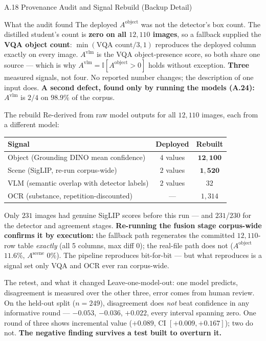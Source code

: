 \documentclass[aspectratio=169,11pt]{beamer}
\begin{document}
\begin{frame}{A.18 Provenance Audit and Signal Rebuild (Backup Detail)}
\scriptsize
\vspace{-4mm}
\begin{block}{\scriptsize What the audit found}
\tiny The deployed $A^{\text{object}}$ was not the detector's box count. The distilled student's count is \textbf{zero on all $12{,}110$ images}, so a fallback supplied the \textbf{VQA object count}: $\min(\text{VQA count}/3,1)$ reproduces the deployed column exactly on every image. $A^{\text{vlm}}$ is the VQA object-presence score, so both share one source --- which is why $A^{\text{vlm}}=\mathbb{I}[A^{\text{object}}>0]$ holds without exception. \textbf{Three} measured signals, not four. No reported number changes; the description of one input does. \textbf{A second defect, found only by running the models (A.24):} $A^{\text{vlm}}$ is $2/4$ on $98.9\%$ of the corpus.
\end{block}
\vspace{-4.5mm}
\begin{block}{\scriptsize The rebuild}
\tiny Re-derived from raw model outputs for all $12{,}110$ images, each from a different model:
\vskip 2pt
\begin{center}
\begin{tabular}{lcc}
\toprule
\textbf{Signal} & \textbf{Deployed} & \textbf{Rebuilt} \\
\midrule
Object (Grounding DINO mean confidence) & $4$ values & $\mathbf{12{,}100}$ \\
Scene (SigLIP, re-run corpus-wide) & $2$ values & $\mathbf{1{,}520}$ \\
VLM (semantic overlap with detector labels) & $2$ values & $32$ \\
OCR (substance, repetition-discounted) & --- & $1{,}314$ \\
\bottomrule
\end{tabular}
\end{center}
Only $231$ images had genuine SigLIP scores before this run --- and $231$/$230$ for the detector and agreement stages. \textbf{Re-running the fusion stage corpus-wide confirms it by execution:} the fallback path regenerates the committed $12{,}110$-row table \emph{exactly} (all 5 columns, max diff $0$); the real-file path does not ($A^{\text{object}}$ $11.6\%$, $A^{\text{scene}}$ $0\%$). The pipeline reproduces bit-for-bit --- but what reproduces is a signal set only VQA and OCR ever ran corpus-wide.
\end{block}
\vspace{-4.5mm}
\begin{alertblock}{\scriptsize The retest, and what it changed}
\tiny Leave-one-model-out: one model predicts, disagreement is measured over the other three, error comes from human review. On the held-out split ($n=249$), disagreement does \emph{not} beat confidence in any informative round --- $-0.053$, $-0.036$, $+0.022$, every interval spanning zero. One round of three shows incremental value ($+0.089$, CI $[+0.009,+0.167]$); two do not. \textbf{The negative finding survives a test built to overturn it.}
\end{alertblock}
\end{frame}
\end{document}
